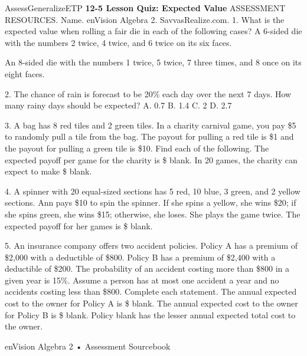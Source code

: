 \documentclass{article}
\newenvironment{te-addendum}[2]{}{}     %
\newcommand{\answer}[1]{}               %
\newcommand{\te}[1]{}                   %
\begin{document}
\begin{te-addendum}{Assess}{GeneralizeETP}
\textbf{12-5 Lesson Quiz: Expected Value}
ASSESSMENT RESOURCES. Name. enVision Algebra 2. SavvasRealize.com.
1. What is the expected value when rolling a fair die in each of the following cases?
A 6-sided die with the numbers 2 twice, 4 twice, and 6 twice on its six faces.
\answer{4}
An 8-sided die with the numbers 1 twice, 5 twice, 7 three times, and 8 once on its eight faces.
\answer{5.125}
2. The chance of rain is forecast to be 20\% each day over the next 7 days. How many rainy days should be expected?
A. 0.7
B. 1.4
C. 2
D. 2.7
\answer{B}
3. A bag has 8 red tiles and 2 green tiles. In a charity carnival game, you pay \$5 to randomly pull a tile from the bag. The payout for pulling a red tile is \$1 and the payout for pulling a green tile is \$10. Find each of the following.
The expected payoff per game for the charity is \$ blank.
In 20 games, the charity can expect to make \$ blank.
\answer{2.20; 44}
4. A spinner with 20 equal-sized sections has 5 red, 10 blue, 3 green, and 2 yellow sections. Ann pays \$10 to spin the spinner. If she spins a yellow, she wins \$20; if she spins green, she wins \$15; otherwise, she loses.
She plays the game twice. The expected payoff for her games is \$ blank.
\answer{-5.75}
\te{Printed -5.75 is the expected payoff for one game; likely -11.50 for two games.}
5. An insurance company offers two accident policies. Policy A has a premium of \$2,000 with a deductible of \$800. Policy B has a premium of \$2,400 with a deductible of \$200. The probability of an accident costing more than \$800 in a given year is 15\%. Assume a person has at most one accident a year and no accidents costing less than \$800. Complete each statement.
The annual expected cost to the owner for Policy A is \$ blank.
The annual expected cost to the owner for Policy B is \$ blank.
Policy blank has the lesser annual expected total cost to the owner.
\answer{2,120; 2,430; A}
enVision Algebra 2 • Assessment Sourcebook
\end{te-addendum}
\end{document}
